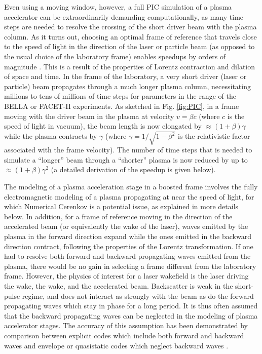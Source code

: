 Even using a moving window, however, a full PIC simulation of a plasma accelerator can be extraordinarily demanding computationally, as many time steps are needed to resolve the crossing of the short driver beam with the plasma column. As it turns out, choosing an optimal frame of reference that travels close to the speed of light in the direction of the laser or particle beam (as opposed to the usual choice of the laboratory frame) enables speedups by orders of magnitude \cite{Vayprl07,Vaypop2011}. This is a result of the properties of Lorentz contraction and dilation of space and time. In the frame of the laboratory, a very short driver (laser or particle) beam propagates through a much longer plasma column, necessitating millions to tens of millions of time steps for parameters in the range of the BELLA or FACET-II experiments. As sketched in Fig. \ref{fig:PIC}, in a frame moving with the driver beam in the plasma at velocity $v=\beta c$ (where $c$ is the speed of light in vacuum), the beam length is now elongated by $\approx(1+\beta)\gamma$ while the plasma contracts by $\gamma$ (where $\gamma=1/\sqrt{1-\beta^2}$ is the relativistic factor associated with the frame velocity). The number of time steps that is needed to simulate a ``longer'' beam through a ``shorter'' plasma is now reduced by up to $\approx(1+\beta) \gamma^2$ (a detailed derivation of the speedup is given below).

The modeling of a plasma acceleration stage in a boosted frame
involves the fully electromagnetic modeling of a plasma propagating at near the speed of light, for which Numerical Cerenkov
\cite{Borisjcp73,Habericnsp73} is a potential issue, as explained in more details below.
In addition, for a frame of reference moving in the direction of the accelerated beam (or equivalently the wake of the laser),
waves emitted by the plasma in the forward direction expand
while the ones emitted in the backward direction contract, following the properties of the Lorentz transformation.
If one had to resolve both forward and backward propagating
waves emitted from the plasma, there would be no gain in selecting a frame different from the laboratory frame. However,
the physics of interest for a laser wakefield is the laser driving the wake, the wake, and the accelerated beam.
Backscatter is weak in the short-pulse regime, and does not
interact as strongly with the beam as do the forward propagating waves
which stay in phase for a long period. It is thus often assumed that the backward propagating waves
can be neglected in the modeling of plasma accelerator stages. The accuracy  of this assumption has been demonstrated by
comparison between explicit codes which include both forward and backward waves and envelope or quasistatic codes which neglect backward waves
\cite{Geddesjp08,Geddespac09,Cowanaac08}.

